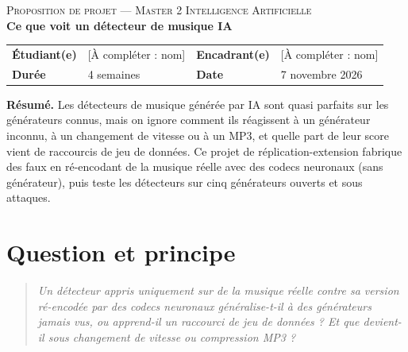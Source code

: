 \documentclass[11pt,a4paper]{article}
\newcommand{\acompleter}[1]{\textcolor{red!70!black}{[À compléter : #1]}}
\begin{document}
\begin{center}
{\large\scshape Proposition de projet --- Master 2 Intelligence Artificielle}\\[0.5em]
{\LARGE\bfseries Ce que voit un détecteur de musique IA}
\end{center}

\vspace{-0.2em}
\begin{tabularx}{\textwidth}{@{}>{\bfseries}l X >{\bfseries}l X@{}}
Étudiant(e) & \acompleter{nom} & Encadrant(e) & \acompleter{nom}\\
Durée & 4 semaines & Date & 7 novembre 2026\\
\end{tabularx}

\vspace{0.3em}
\textbf{Résumé.} Les détecteurs de musique générée par IA sont quasi parfaits sur les générateurs connus, mais on ignore comment ils réagissent à un générateur inconnu, à un changement de vitesse ou à un MP3, et quelle part de leur score vient de raccourcis de jeu de données. Ce projet de réplication-extension fabrique des \og faux\fg{} en ré-encodant de la musique réelle avec des codecs neuronaux (sans générateur), puis teste les détecteurs sur cinq générateurs ouverts et sous attaques.

\section{Question et principe}

\begin{quote}\small
\emph{Un détecteur appris uniquement sur de la musique réelle contre sa version ré-encodée par des codecs neuronaux généralise-t-il à des générateurs jamais vus, ou apprend-il un raccourci de jeu de données ? Et que devient-il sous changement de vitesse ou compression MP3 ?}
\end{quote}
\end{document}
